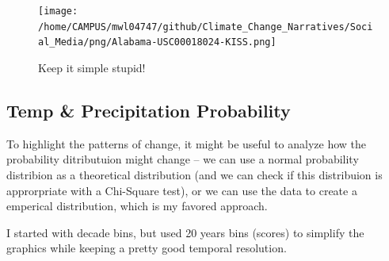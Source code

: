 \documentclass{article}\usepackage[]{graphicx}\usepackage[]{color}
\begin{document}
\begin{figure}
\texttt{[image: /home/CAMPUS/mwl04747/github/Climate\_Change\_Narratives/Social\_Media/png/Alabama-USC00018024-KISS.png]}
\caption{Keep it simple stupid!}
\label{fig:GSOM-KISS}
\end{figure}



\subsection{Temp \& Precipitation Probability}

To highlight the patterns of change, it might be useful to analyze how the probability ditributuion might change -- we can use a normal probability distribion as a theoretical distribution (and we can check if this distribuion is approrpriate with a Chi-Square test), or we can use the data to create a emperical distribution, which is my favored approach. 

I started with decade bins, but used 20 years bins (scores) to simplify the graphics while keeping a pretty good temporal resolution.
\end{document}
